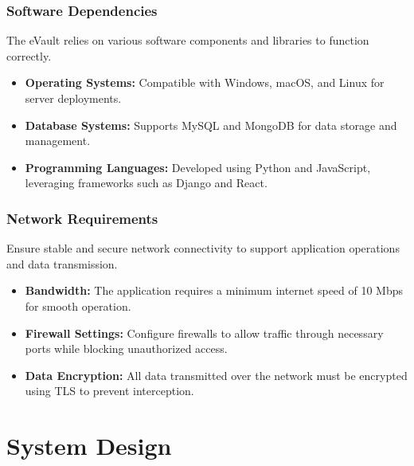 \documentclass[12pt,a4paper]{report}
\begin{document}
   \subsection{Software Dependencies}
   The eVault relies on various software components and libraries to function correctly.
   \begin{itemize}
       \item \textbf{Operating Systems:} Compatible with Windows, macOS, and Linux for server deployments.
       \item \textbf{Database Systems:} Supports MySQL and MongoDB for data storage and management.
       \item \textbf{Programming Languages:} Developed using Python and JavaScript, leveraging frameworks such as Django and React.
   \end{itemize}
   
   \subsection{Network Requirements}
   Ensure stable and secure network connectivity to support application operations and data transmission.
   \begin{itemize}
       \item \textbf{Bandwidth:} The application requires a minimum internet speed of 10 Mbps for smooth operation.
       \item \textbf{Firewall Settings:} Configure firewalls to allow traffic through necessary ports while blocking unauthorized access.
       \item \textbf{Data Encryption:} All data transmitted over the network must be encrypted using TLS to prevent interception.
   \end{itemize}





\chapter{System Design}
\end{document}
